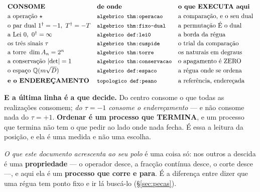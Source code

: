 \documentclass[11pt,a4paper]{article}
\newcommand{\code}[1]{\texttt{\small #1}}
\newcommand{\dg}{^{\dagger}}
\newcommand{\abs}[1]{\lvert #1\rvert}
\begin{document}
\[
\begin{array}{lll}
\textbf{CONSOME} & \textbf{de onde} & \textbf{o que EXECUTA aqui}\\[3pt]
\text{a operação }\star & \code{algebrico thm:operacao} & \text{a comparação, e o seu dual}\\[2pt]
\text{o par dual } 1\dg=-1,\ T\dg=-T & \code{algebrico thm:fixo-dual} & \text{a permutação É o dual}\\[2pt]
\text{a Lei 0},\ 0\dg=\infty & \code{algebrico def:lei0} & \text{a borda da régua}\\[2pt]
\text{os três sinais }\tau & \code{algebrico thm:cuspide} & \text{o trial da comparação}\\[2pt]
\text{a torre } \dim A_n=2^n & \code{algebrico thm:torre} & \text{os naturais em degraus}\\[2pt]
\text{a conservação }\abs{\det}=1 & \code{algebrico thm:conservacao} & \text{o apagamento é ZERO}\\[2pt]
\text{o espaço } \mathbb{Q}(m\sqrt D) & \code{algebrico def:espaco} & \text{a régua onde se ordena}\\[4pt]
\textbf{e o ENDEREÇAMENTO} & \code{topologico def:peano} & \text{a referência, endereçada}
\end{array}
\]

\noindent\textbf{E a última linha é a que decide.} Do centro consome o que todas as
realizações consomem; \emph{do $\tau=-1$ consome o endereçamento} --- e não consome nada do
$\tau=+1$. \textbf{Ordenar é um processo que TERMINA}, e um processo que termina não tem o
que pedir ao lado onde nada fecha. É essa a leitura da posição, e ela é uma medida e não
uma escolha.

\medskip
\noindent\emph{O que este documento acrescenta ao seu polo} é uma coisa só: nos outros a
descida é uma \textbf{propriedade} --- o operador desce, a fracção contínua desce, o corte
desce ---, e aqui ela é um \textbf{processo que corre e para}. É a diferença entre dizer
que uma régua tem ponto fixo e ir lá buscá-lo (\S\ref{sec:pecas}).
\end{document}
